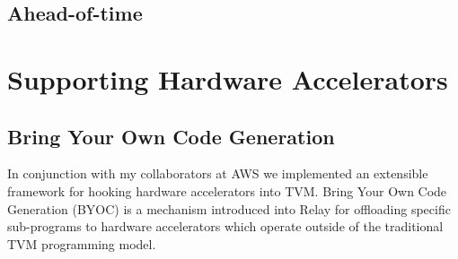 
\subsection{Ahead-of-time}




\section{Supporting Hardware Accelerators}
\label{sec:accel}

\subsection{Bring Your Own Code Generation}
\label{sec:byoc}

In conjunction with my collaborators at AWS we implemented an
  extensible framework for hooking hardware accelerators into
  TVM.
Bring Your Own Code Generation (BYOC) is a mechanism introduced
  into Relay for offloading specific sub-programs to hardware
  accelerators which operate outside of the traditional TVM
  programming model.

